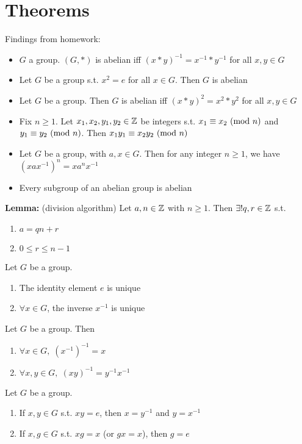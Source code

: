 \pagebreak

\section*{Theorems}

Findings from homework:
\begin{itemize}
    \item $G$ a group. $(G, \ast)$ is abelian iff $(x \ast y)^{-1} = x^{-1} \ast y^{-1} $ for all $x, y \in G$
    \item Let $G$ be a group s.t. $x^2 = e$ for all $x \in G$. Then $G$ is abelian
    \item Let $G$ be a group. Then $G$ is abelian iff $(x \ast y)^2 = x^2 \ast y^2 $ for all $x, y \in G$
    \item Fix $n \ge 1$. Let $x_1, x_2, y_1, y_2 \in \mathbb{Z}$ be integers s.t. $x_1 \equiv x_2 \text{ (mod } n)$ and $y_1 \equiv y_2 \text{ (mod } n)$. Then $x_1y_1 \equiv x_2y_2 \text{ (mod } n)$
    \item Let $G$ be a group, with $a, x \in G$. Then for any integer $n \ge 1$, we have \\ $(xax^{-1})^n = xa^nx^{-1}$ 
    \item Every subgroup of an abelian group is abelian
\end{itemize}

\bigskip

\noindent
\textbf{Lemma:} (division algorithm) Let $a, n \in \mathbb{Z}$ with $ n \ge 1$. Then $\exists ! q, r \in \mathbb{Z}$ s.t.
\begin{enumerate}
    \item $a = qn + r$
    \item $0 \le r \le n - 1$
\end{enumerate}

\prop Let $G$ be a group.
\begin{enumerate}
    \item The identity element $e$ is unique
    \item $\forall x \in G$, the inverse $x^{-1}$ is unique
\end{enumerate}

\prop Let $G$ be a group. Then 
\begin{enumerate}
    \item $\forall x \in G,\; (x^{-1})^{-1} = x$
    \item $\forall x, y \in G, \; (xy)^{-1}=y^{-1}x^{-1}$
\end{enumerate}

\prop Let $G$ be a group. 
\begin{enumerate}
    \item If $x, y \in G$ s.t. $xy = e$, then $x=y^{-1}$ and $y=x^{-1}$
    \item If $x, g \in G$ s.t. $xg = x$ (or $gx = x$), then $g = e$
\end{enumerate}

